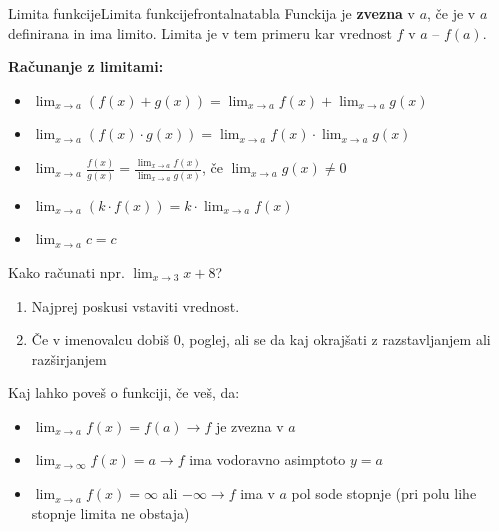 \begin{priprava}{}{}{Limita funkcije}{Limita funkcije}{frontalna}{tabla}
Funckija je \textbf{zvezna} v $ a $, če je v $ a $ definirana in ima limito. Limita je v tem primeru kar vrednost $ f $ v $ a $ -- $ f(a) $. 

\newpage

\textbf{Računanje z limitami:} 
\begin{itemize}
    \item $ \lim_{x \rightarrow a} (f(x) + g(x)) = \lim_{x \rightarrow a} f(x) + \lim_{x \rightarrow a} g(x) $
    \item $ \lim_{x \rightarrow a} (f(x) \cdot g(x)) = \lim_{x \rightarrow a} f(x) \cdot \lim_{x \rightarrow a} g(x) $
    \item $ \lim_{x \rightarrow a} \frac{f(x)}{g(x)} = \frac{\lim_{x \rightarrow a} f(x)}{\lim_{x \rightarrow a} g(x)} $, če $ \lim_{x \rightarrow a} g(x) \neq 0 $
    \item $ \lim_{x \rightarrow a} (k \cdot f(x)) =  k \cdot \lim_{x \rightarrow a} f(x) $
    \item $ \lim_{x \rightarrow a} c = c $
\end{itemize}

Kako računati npr. $ \lim_{x \rightarrow 3} x + 8 $?
\begin{enumerate}
    \item Najprej poskusi vstaviti vrednost.
    \item Če v imenovalcu dobiš 0, poglej, ali se da kaj okrajšati z razstavljanjem ali razširjanjem
\end{enumerate}


Kaj lahko poveš o funkciji, če veš, da: 
\begin{itemize}
    \item $ \lim_{x \rightarrow a} f(x) = f(a) \rightarrow f $ je zvezna v $ a $
    \item $ \lim_{x \rightarrow \infty} f(x) = a \rightarrow f $ ima vodoravno asimptoto $ y = a $ 
    \item $ \lim_{x \rightarrow a} f(x) = \infty $ ali $ - \infty \rightarrow f $ ima v $ a $ pol sode stopnje (pri polu lihe stopnje limita ne obstaja)
\end{itemize}
    

\end{priprava}

